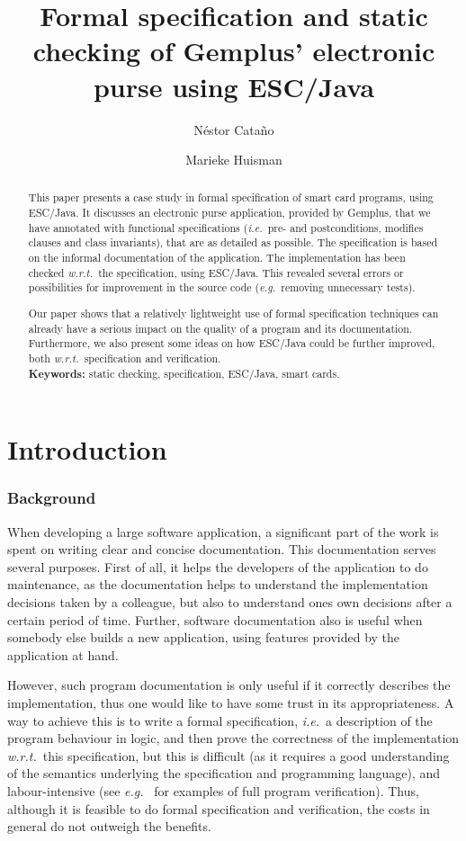 \documentclass[a4paper]{llncs}
\title{Formal specification and static checking of Gemplus' electronic
purse using ESC/Java}
\author{
  N\'estor Cata\~no
\and
  Marieke Huisman
}
\institute{
  INRIA Sophia-Antipolis, France \\ 
  \email{\{Nestor.Catano, Marieke.Huisman\}@sophia.inria.fr}
}
\begin{document}
%

\maketitle


\begin{abstract}
This paper presents a case study in formal specification of smart card
programs, using ESC/Java. It discusses an electronic purse
application, provided by Gemplus, that we have annotated with
functional specifications (\emph{i.e.}~pre- and
postconditions, modifies
clauses and class invariants), that are as detailed as possible. The
specification is based on the informal documentation of the
application. The implementation has been checked \emph{w.r.t.}~the
specification, using ESC/Java.  This revealed several errors or
possibilities for improvement in the source code (\emph{e.g.}~removing
unnecessary tests).

Our paper shows that a relatively
lightweight use of formal specification techniques can already have
a serious impact on the quality of a program and its
documentation. Furthermore, we also present some ideas on how ESC/Java
could be further improved, both
\emph{w.r.t.}~specification and verification.
\\
\textbf{Keywords:} static checking, specification, ESC/Java, smart cards.
\end{abstract}

\section{Introduction}
\label{SectIntro}

\subsubsection{Background}
When developing a large software application, a significant part of
the work is spent on writing clear and concise documentation. This
documentation serves several purposes. First of all, it helps the
developers of the application to do maintenance, as the documentation
helps to understand the implementation decisions taken by a colleague,
but also to understand ones own decisions after a certain period of
time. Further, software documentation also is useful when somebody
else builds a new application, using features provided by the
application at hand.

However, such program documentation is only useful if it correctly
describes the implementation, thus one would like to have some trust
in its appropriateness. A way to achieve this is to write a formal
specification, \emph{i.e.}~a description of the program behaviour in
logic, and then prove the correctness of the implementation
\emph{w.r.t.}~this specification, but this is difficult (as it
requires a good understanding of the semantics underlying the
specification and programming language), and labour-intensive (see
\emph{e.g.}~\cite{HuismanJB00a,BreunesseJB02} for examples of full program
verification). Thus, although it is feasible to do formal
specification and verification, the costs in general do not outweigh
the benefits.
\end{document}
